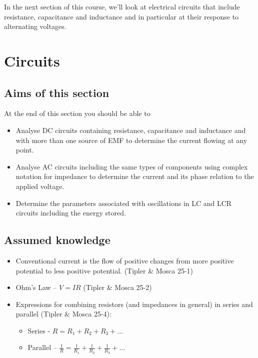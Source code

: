 \documentclass[
]{book}
\begin{document}
In the next section of this course, we'll look at electrical circuits
that include resistance, capacitance and inductance and in particular at
their response to alternating voltages.

\hypertarget{circuits}{%
\chapter{Circuits}\label{circuits}}

\hypertarget{aims-of-this-section-1}{%
\section*{Aims of this section}\label{aims-of-this-section-1}}

At the end of this section you should be able to

\begin{itemize}
\item
  Analyse DC circuits containing resistance, capacitance and
  inductance and with more than one source of EMF to determine the
  current flowing at any point.
\item
  Analyse AC circuits including the same types of components using
  complex notation for impedance to determine the current and its
  phase relation to the applied voltage.
\item
  Determine the parameters associated with oscillations in LC and LCR
  circuits including the energy stored.
\end{itemize}

\hypertarget{assumed-knowledge}{%
\section*{Assumed knowledge}\label{assumed-knowledge}}

\begin{itemize}
\item
  Conventional current is the flow of positive changes from more
  positive potential to less positive potential. (Tipler \& Mosca 25-1)
\item
  Ohm's Law -- \(V = IR\) (Tipler \& Mosca 25-2)
\item
  Expressions for combining resistors (and impedances in general) in
  series and parallel (Tipler \& Mosca 25-4):

  \begin{itemize}
  \item
    Series - \(R = R_1 + R_2+ R_3 + ...\)
  \item
    Parallel --
    \(\frac{1}{R} = \frac{1}{R_1} + \frac{1}{R_2} + \frac{1}{R_3} + ...\)
  \end{itemize}
\end{itemize}
\end{document}
